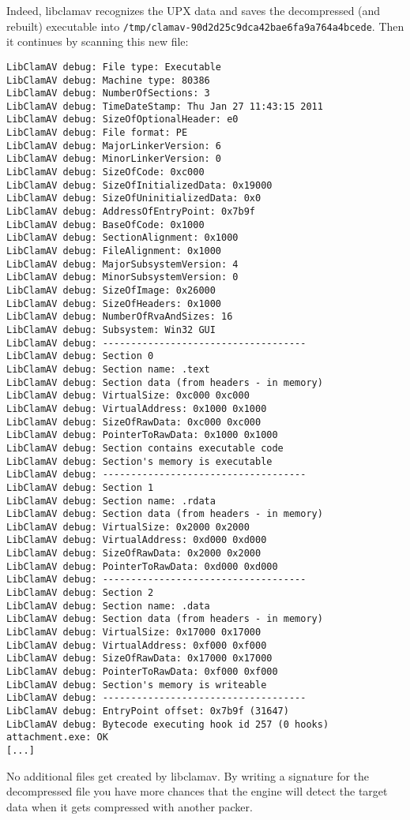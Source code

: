 \documentclass[a4paper,titlepage,12pt]{article}
\begin{document}
    Indeed, libclamav recognizes the UPX data and saves the decompressed
    (and rebuilt) executable into \verb+/tmp/clamav-90d2d25c9dca42bae6fa9a764a4bcede+.
    Then it continues by scanning this new file:
    \begin{verbatim}
LibClamAV debug: File type: Executable
LibClamAV debug: Machine type: 80386
LibClamAV debug: NumberOfSections: 3
LibClamAV debug: TimeDateStamp: Thu Jan 27 11:43:15 2011
LibClamAV debug: SizeOfOptionalHeader: e0
LibClamAV debug: File format: PE
LibClamAV debug: MajorLinkerVersion: 6
LibClamAV debug: MinorLinkerVersion: 0
LibClamAV debug: SizeOfCode: 0xc000
LibClamAV debug: SizeOfInitializedData: 0x19000
LibClamAV debug: SizeOfUninitializedData: 0x0
LibClamAV debug: AddressOfEntryPoint: 0x7b9f
LibClamAV debug: BaseOfCode: 0x1000
LibClamAV debug: SectionAlignment: 0x1000
LibClamAV debug: FileAlignment: 0x1000
LibClamAV debug: MajorSubsystemVersion: 4
LibClamAV debug: MinorSubsystemVersion: 0
LibClamAV debug: SizeOfImage: 0x26000
LibClamAV debug: SizeOfHeaders: 0x1000
LibClamAV debug: NumberOfRvaAndSizes: 16
LibClamAV debug: Subsystem: Win32 GUI
LibClamAV debug: ------------------------------------
LibClamAV debug: Section 0
LibClamAV debug: Section name: .text
LibClamAV debug: Section data (from headers - in memory)
LibClamAV debug: VirtualSize: 0xc000 0xc000
LibClamAV debug: VirtualAddress: 0x1000 0x1000
LibClamAV debug: SizeOfRawData: 0xc000 0xc000
LibClamAV debug: PointerToRawData: 0x1000 0x1000
LibClamAV debug: Section contains executable code
LibClamAV debug: Section's memory is executable
LibClamAV debug: ------------------------------------
LibClamAV debug: Section 1
LibClamAV debug: Section name: .rdata
LibClamAV debug: Section data (from headers - in memory)
LibClamAV debug: VirtualSize: 0x2000 0x2000
LibClamAV debug: VirtualAddress: 0xd000 0xd000
LibClamAV debug: SizeOfRawData: 0x2000 0x2000
LibClamAV debug: PointerToRawData: 0xd000 0xd000
LibClamAV debug: ------------------------------------
LibClamAV debug: Section 2
LibClamAV debug: Section name: .data
LibClamAV debug: Section data (from headers - in memory)
LibClamAV debug: VirtualSize: 0x17000 0x17000
LibClamAV debug: VirtualAddress: 0xf000 0xf000
LibClamAV debug: SizeOfRawData: 0x17000 0x17000
LibClamAV debug: PointerToRawData: 0xf000 0xf000
LibClamAV debug: Section's memory is writeable
LibClamAV debug: ------------------------------------
LibClamAV debug: EntryPoint offset: 0x7b9f (31647)
LibClamAV debug: Bytecode executing hook id 257 (0 hooks)
attachment.exe: OK
[...]
    \end{verbatim}
    No additional files get created by libclamav. By writing
    a signature for the decompressed file you have more chances
    that the engine will detect the target data when it gets
    compressed with another packer.
\end{document}

